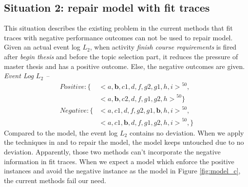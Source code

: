 \subsection{Situation 2: \small{repair model with fit traces}}
This situation describes the existing problem in the current methods that fit traces with negative performance outcomes can not be used to repair model. Given an actual event log $L_2$, when activity \emph{finish course requirements} is fired after \emph{begin thesis} and before the topic selection part, it reduces the pressure of master thesis and has a positive outcome. Else, the negative outcomes are given. 
\emph{Event Log $L_2$ -- }
\begin{align*}
Positive:\{ & { <a,\textbf{b},c1,d,f,g2,g1,h,i>}^{50}, \\   &{<a,\textbf{b},c2,d,f,g1,g2,h>}^{50} \}  \\
Negative: \{ & {<a,c1,d,f,g2,g1,\textbf{b},h,i>}^{50}, \\
& {<a,c1,\textbf{b},d,f,g1,g2,h,i>}^{50},  \}
\end{align*}
Compared to the model, the event log $L_2$ contains no deviation. When we apply the techniques in \cite{fahland2015model} and \cite{dees2017enhancing} to repair the model, the model keeps untouched due to no deviation. Apparently, those two methods can't incorporate the negative information in fit traces. When we expect a model which enforce the positive instances and avoid the negative instance as the model in Figure \ref{fig:model_c}, the current methods fail our need. 
